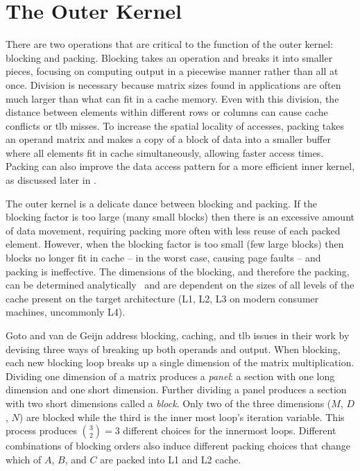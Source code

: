 \documentclass[\main/thesis.tex]{subfiles}
\begin{document}
\section{The Outer Kernel}
\label{sec:outerKernel}
There are two operations that are critical to the function of the outer kernel: blocking and packing.
Blocking takes an operation and breaks it into smaller pieces, focusing on computing output in a piecewise manner rather than all at once.
Division is necessary because matrix sizes found in applications are often much larger than what can fit in a cache memory.
Even with this division, the distance between elements within different rows or columns can cause cache conflicts or \gls{tlb} misses.
To increase the spatial locality of accesses, packing takes an operand matrix and makes a copy of a block of data into a smaller buffer where all elements fit in cache simultaneously, allowing faster access times.
Packing can also improve the data access pattern for a more efficient inner kernel, as discussed later in .

The outer kernel is a delicate dance between blocking and packing.
If the blocking factor is too large (\ie many small blocks) then there is an excessive amount of data movement, requiring packing more often with less reuse of each packed element.
However, when the blocking factor is too small (\ie few large blocks) then blocks no longer fit in cache -- in the worst case, causing page faults -- and packing is ineffective.
The dimensions of the blocking, and therefore the packing, can be determined analytically~\autocite{low2016analytical} and are dependent on the sizes of all levels of the cache present on the target architecture (L1, L2, L3 on modern consumer machines, uncommonly L4).

Goto and van de Geijn address blocking, caching, and \gls{tlb} issues in their work by devising three ways of breaking up both operands and output.
When blocking, each new blocking loop breaks up a single dimension of the matrix multiplication.
Dividing one dimension of a matrix produces a \emph{panel}: a section with one long dimension and one short dimension.
Further dividing a panel produces a section with two short dimensions called a \emph{block}.
Only two of the three dimensions ($M$, $D$, $N$) are blocked while the third is the inner most loop's iteration variable.
This process produces $\binom{3}{2}=3$ different choices for the innermost loops.\footnotemark
{}
Different combinations of blocking orders also induce different packing choices that change which of $A$, $B$, and $C$ are packed into L1 and L2 cache.
\end{document}
